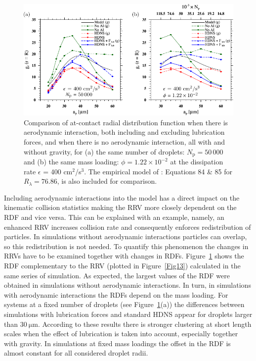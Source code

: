 \documentclass[../thesis.tex]{subfiles}
\begin{document}
\begin{figure}%
\center
\includegraphics[width=\textwidth]{../figs/JFM/fig14.pdf}
\caption{Comparison of at-contact radial distribution function when there is aerodynamic interaction, both including and excluding lubrication forces, and when there is no aerodynamic interaction, all with and without gravity, for (a) the same number of droplets: $N_\mathrm{p} = 50\,000$ and (b) the same mass loading: $\phi = 1.22\times10^{-2}$ at the dissipation rate $\epsilon$ = 400 cm$^2$/s$^3$. The empirical model of \cite{ARW08}: Equations 84 \& 85 for $R_{\lambda}=76.86$, is also included for comparison.}
\label{Fig14}
\end{figure}%

Including aerodynamic interactions into the model has a direct impact on the kinematic collision statistics making the RRV more closely dependent on the RDF and vice versa. This can be explained with an example, namely, an enhanced RRV increases collision rate and consequently enforces redistribution of particles. In simulations without aerodynamic interactions particles can overlap, so this redistribution is not needed. To quantify this phenomenon the changes in RRVs have to be examined together with changes in RDFs. Figure~\ref{Fig14} shows the RDF complementary to the RRV (plotted in Figure~\ref{Fig13}) calculated in the same series of simulation. As expected, the largest values of the RDF were obtained in simulations without aerodynamic interactions. In turn, in simulations with aerodynamic interactions the RDFs depend on the mass loading. For systems at a fixed number of droplets (see Figure~\ref{Fig14}(a)) the differences between simulations with lubrication forces and standard HDNS appear for droplets larger than $30~\mathrm{\mu m}$. According to these results there is stronger clustering at short length scales when the effect of lubrication is taken into account, especially together with gravity. In simulations at fixed mass loadings the offset in the RDF is almost constant for all considered droplet radii.
\end{document}
